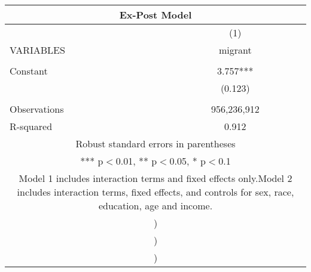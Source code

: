 \begin{tabular}{lc}
\multicolumn{2}{c}{Ex-Post Model} \\ \hline
 & (1) \\
VARIABLES & migrant \\ \hline
 &  \\
Constant & 3.757*** \\
 & (0.123) \\
 &  \\
Observations & 956,236,912 \\
 R-squared & 0.912 \\ \hline
\multicolumn{2}{c}{ Robust standard errors in parentheses} \\
\multicolumn{2}{c}{ *** p$<$0.01, ** p$<$0.05, * p$<$0.1} \\
\multicolumn{2}{c}{ Model 1 includes interaction terms and fixed effects only.\newline Model 2 includes interaction terms, fixed effects, and controls for sex, race, education, age and income.} \\
\multicolumn{2}{c}{ )} \\
\multicolumn{2}{c}{ )} \\
\multicolumn{2}{c}{ )} \\
\end{tabular}

